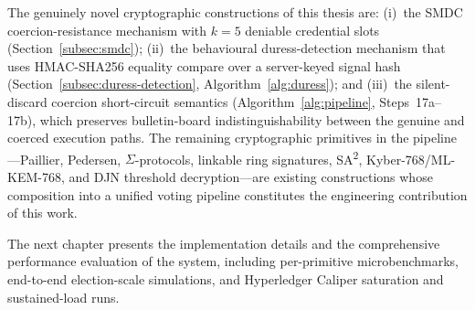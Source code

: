 The genuinely novel cryptographic constructions of this thesis are: (i)~the SMDC coercion-resistance mechanism with $k = 5$ deniable credential slots (Section~\ref{subsec:smdc}); (ii)~the behavioural duress-detection mechanism that uses HMAC-SHA256 equality compare over a server-keyed signal hash (Section~\ref{subsec:duress-detection}, Algorithm~\ref{alg:duress}); and (iii)~the silent-discard coercion short-circuit semantics (Algorithm~\ref{alg:pipeline}, Steps~17a--17b), which preserves bulletin-board indistinguishability between the genuine and coerced execution paths. The remaining cryptographic primitives in the pipeline---Paillier, Pedersen, $\Sigma$-protocols, linkable ring signatures, SA\textsuperscript{2}, Kyber-768/ML-KEM-768, and DJN threshold decryption---are existing constructions whose composition into a unified voting pipeline constitutes the engineering contribution of this work.

The next chapter presents the implementation details and the comprehensive performance evaluation of the system, including per-primitive microbenchmarks, end-to-end election-scale simulations, and Hyperledger Caliper saturation and sustained-load runs.
